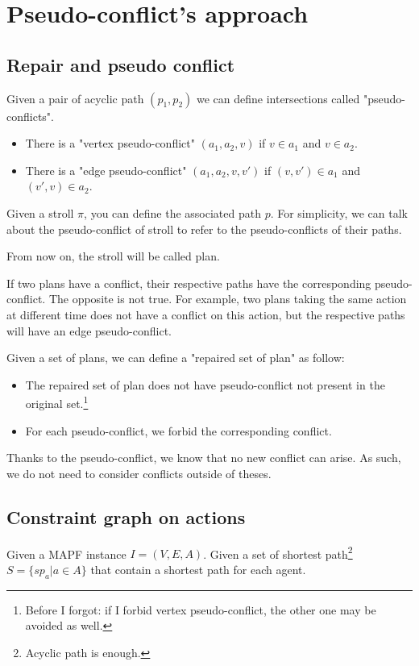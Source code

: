 \section{Pseudo-conflict's approach}\label{sec:approach}

\subsection{Repair and pseudo conflict}
Given a pair of acyclic path $(p_1,p_2)$ we can define intersections called "pseudo-conflicts".

\begin{itemize}
  \item There is a "vertex pseudo-conflict" $(a_1,a_2,v)$ if $v \in a_1$ and $v \in a_2$.
  \item There is a "edge pseudo-conflict" $(a_1,a_2,v,v')$ if $(v,v') \in a_1$ and $(v',v) \in a_2$.
\end{itemize}

Given a stroll $\pi$, you can define the associated path $p$. For simplicity, we can talk about the pseudo-conflict of stroll to refer to the pseudo-conflicts of their paths.

From now on, the stroll will be called plan.

If two plans have a conflict, their respective paths have the corresponding pseudo-conflict. The opposite is not true. For example, two plans taking the same action at different time does not have a conflict on this action, but the respective paths will have an edge pseudo-conflict.

Given a set of plans, we can define a "repaired set of plan" as follow:
\begin{itemize}
  \item The repaired set of plan does not have pseudo-conflict not present in the original set.\footnote{Before I forgot: if I forbid vertex pseudo-conflict, the other one may be avoided as well.}
  \item For each pseudo-conflict, we forbid the corresponding conflict.
\end{itemize}
Thanks to the pseudo-conflict, we know that no new conflict can arise. As such, we do not need to consider conflicts outside of theses.

\subsection{Constraint graph on actions}
Given a MAPF instance $I=(V,E,A)$.
Given a set of shortest path\footnote{Acyclic path is enough.} $S = \{sp_a | a \in A \}$ that contain a shortest path for each agent.

